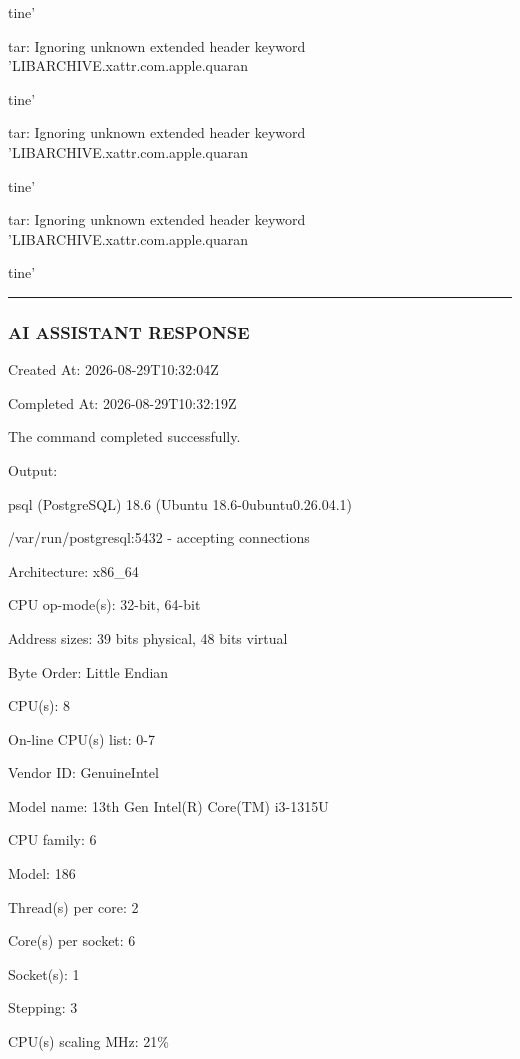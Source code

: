 \documentclass[11pt,a4paper]{article}
\begin{document}
tine'

tar: Ignoring unknown extended header keyword 'LIBARCHIVE.xattr.com.apple.quaran

tine'

tar: Ignoring unknown extended header keyword 'LIBARCHIVE.xattr.com.apple.quaran

tine'

tar: Ignoring unknown extended header keyword 'LIBARCHIVE.xattr.com.apple.quaran

tine'


\hrule

\subsubsection{AI ASSISTANT RESPONSE}

Created At: 2026-08-29T10:32:04Z

Completed At: 2026-08-29T10:32:19Z


The command completed successfully.

Output:

psql (PostgreSQL) 18.6 (Ubuntu 18.6-0ubuntu0.26.04.1)

/var/run/postgresql:5432 - accepting connections

Architecture:                            x86\_64

CPU op-mode(s):                          32-bit, 64-bit

Address sizes:                           39 bits physical, 48 bits virtual

Byte Order:                              Little Endian

CPU(s):                                  8

On-line CPU(s) list:                     0-7

Vendor ID:                               GenuineIntel

Model name:                              13th Gen Intel(R) Core(TM) i3-1315U

CPU family:                              6

Model:                                   186

Thread(s) per core:                      2

Core(s) per socket:                      6

Socket(s):                               1

Stepping:                                3

CPU(s) scaling MHz:                      21\%
\end{document}
